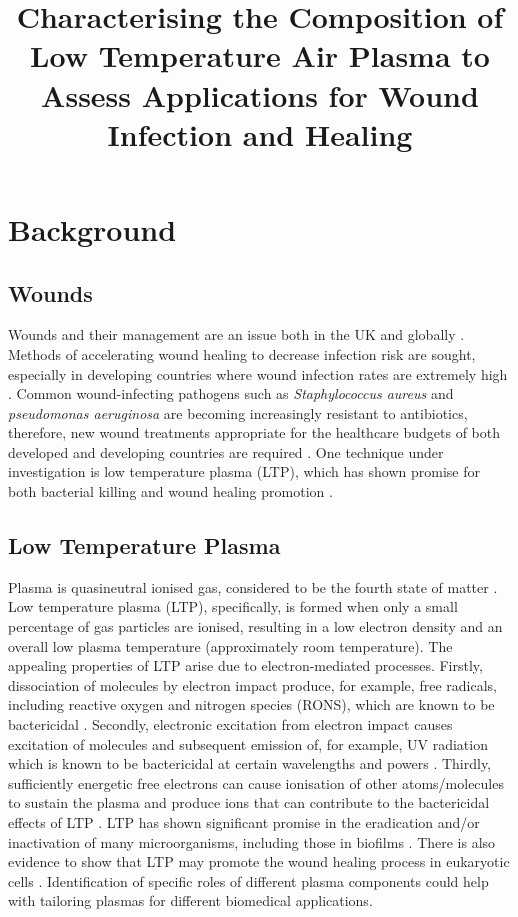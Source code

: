 \documentclass[11pt, oneside]{article}   	%
\title{Characterising the Composition of Low Temperature Air Plasma to Assess Applications for Wound Infection and Healing}
\date{}							%
\begin{document}
\maketitle
\section*{Background}
\subsection*{Wounds}

Wounds and their management are an issue both in the UK and globally \cite{Posnett2008burden}.
Methods of accelerating wound healing to decrease infection risk are sought, especially in developing countries where wound infection rates are extremely high \cite{Kihla2014risk}. 
Common wound-infecting pathogens such as \textit{Staphylococcus aureus} and \textit{pseudomonas aeruginosa} \cite{Church2006burn, Bowler2001wound} are becoming increasingly resistant to antibiotics, therefore, new wound treatments appropriate for the healthcare budgets of both developed and developing countries are required \cite{Chambers2009waves, Godebo2013multidrug, Howell2005a}.
One technique under investigation is low temperature plasma (LTP), which has shown promise for both bacterial killing and wound healing promotion \cite{Kong2009plasma, Kramer2013suitability, Isbary2012successful, Isbary2010a}.


\subsection*{Low Temperature Plasma}

Plasma is quasineutral ionised gas, considered to be the fourth state of matter \cite{Fridman2013plasmamedicine}.
Low temperature plasma (LTP), specifically, is formed when only a small percentage of gas particles are ionised, resulting in a low electron density and an overall low plasma temperature (approximately room temperature).
The appealing properties of LTP arise due to electron-mediated processes.
Firstly, dissociation of molecules by electron impact produce, for example, free radicals, including reactive oxygen and nitrogen species (RONS), which are known to be bactericidal \cite{Kong2009plasma}.
Secondly, electronic excitation from electron impact causes excitation of molecules and subsequent emission of, for example, UV radiation which is known to be bactericidal at certain wavelengths and powers \cite{Laroussi2004evaluation}.
Thirdly, sufficiently energetic free electrons can cause ionisation of other atoms/molecules to sustain the plasma and produce ions that can contribute to the bactericidal effects of LTP \cite{Mendis2000a, Laroussi2002nonthermal}.
LTP has shown significant promise in the eradication and/or inactivation of many microorganisms, including those in biofilms \cite{Laroussi2005low}. 
There is also evidence to show that LTP may promote the wound healing process in eukaryotic cells \cite{Haertel2014nonthermal, Kramer2013suitability}.
Identification of specific roles of different plasma components could help with tailoring plasmas for different biomedical applications.
\end{document}
